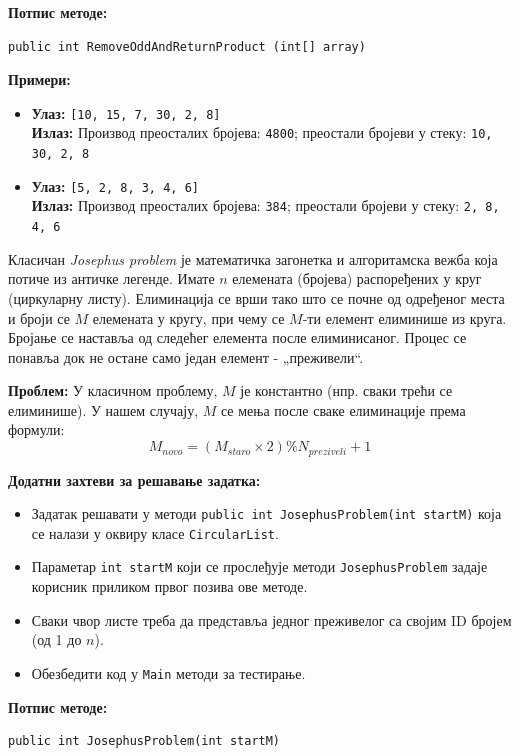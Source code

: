 \textbf{Потпис методе:}
\begin{Verbatim}[fontsize=\small]
public int RemoveOddAndReturnProduct (int[] array)
\end{Verbatim}

\textbf{Примери:}
\begin{itemize}
	\item \textbf{Улаз:} \texttt{[10, 15, 7, 30, 2, 8]} \\
		  \textbf{Излаз:} Производ преосталих бројева: \texttt{4800}; преостали бројеви у стеку: \texttt{10, 30, 2, 8}
	\item \textbf{Улаз:} \texttt{[5, 2, 8, 3, 4, 6]} \\
		  \textbf{Излаз:} Производ преосталих бројева: \texttt{384}; преостали бројеви у стеку: \texttt{2, 8, 4, 6}
\end{itemize}

Класичан \textit{Josephus problem} је математичка загонетка и алгоритамска вежба која потиче из античке легенде. Имате $n$ елемената (бројева) распоређених у круг (циркуларну листу). Елиминација се врши тако што се почне од одређеног места и броји се $M$ елемената у кругу, при чему се $M$-ти елемент елиминише из круга. Бројање се наставља од следећег елемента после елиминисаног. Процес се понавља док не остане само један елемент - „преживели“.

\textbf{Проблем:}
У класичном проблему, $M$ је константно (нпр. сваки трећи се елиминише). У нашем случају, $M$ се мења после сваке елиминације према формули:
$$
M_{novo} = (M_{staro} \times 2) \% N_{preziveli} + 1
$$

\textbf{Додатни захтеви за решавање задатка:}
\begin{itemize}
	\item Задатак решавати у методи \texttt{public int JosephusProblem(int startM)} која се налази у оквиру класе \texttt{CircularList}.
	\item Параметар \texttt{int startM} који се прослеђује методи \texttt{JosephusProblem} задаје корисник приликом првог позива ове методе.
	\item Сваки чвор листе треба да представља једног преживелог са својим ID бројем (од 1 до $n$).
	\item Обезбедити код у \texttt{Main} методи за тестирање.
\end{itemize}

\textbf{Потпис методе:}
\begin{Verbatim}[fontsize=\small]
public int JosephusProblem(int startM)
\end{Verbatim}

